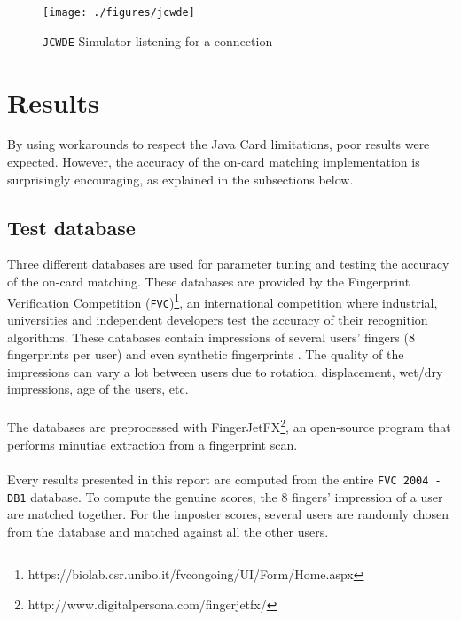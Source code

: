 \documentclass[a4paper,12pt]{article}
\begin{document}
\begin{figure}
    \center
    \texttt{[image: ./figures/jcwde]}
    \caption{\texttt{JCWDE} Simulator listening for a connection}
\end{figure}
\newpage

\section{Results}
\label{results}
By using workarounds to respect the Java Card limitations, poor results were expected. However, the accuracy of the on-card matching implementation is surprisingly encouraging, as explained in the subsections below.
\subsection{Test database}
Three different databases \cite{fvc2000}\cite{fvc2002}\cite{fvc2004} are used for parameter tuning and testing the accuracy of the on-card matching. These databases are provided by the Fingerprint Verification Competition (\texttt{FVC})\footnote{https://biolab.csr.unibo.it/fvcongoing/UI/Form/Home.aspx}, an international competition where industrial, universities and independent developers test the accuracy of their recognition algorithms. These databases contain impressions of several users' fingers (8 fingerprints per user) and even synthetic fingerprints \cite{synthetic}. The quality of the impressions can vary a lot between users due to rotation, displacement, wet/dry impressions, age of the users, etc.\\\\
The databases are preprocessed with FingerJetFX\footnote{http://www.digitalpersona.com/fingerjetfx/}, an open-source program that performs minutiae extraction from a fingerprint scan.\\\\
Every results presented in this report are computed from the entire \texttt{FVC 2004 - DB1} database. To compute the genuine scores, the 8 fingers' impression of a user are matched together. For the imposter scores, several users are randomly chosen from the database and matched against all the other users.
\end{document}
